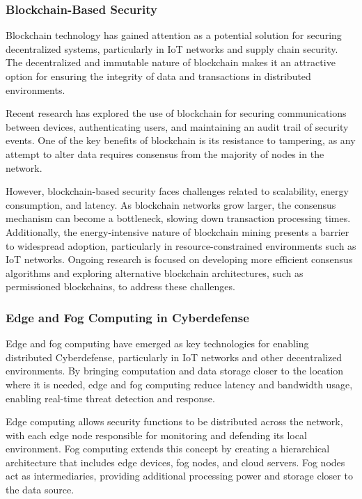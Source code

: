 \subsubsection{Blockchain-Based Security}

Blockchain technology has gained attention as a potential solution for securing decentralized systems, particularly in IoT networks and supply chain security. The decentralized and immutable nature of blockchain makes it an attractive option for ensuring the integrity of data and transactions in distributed environments.

Recent research has explored the use of blockchain for securing communications between devices, authenticating users, and maintaining an audit trail of security events. One of the key benefits of blockchain is its resistance to tampering, as any attempt to alter data requires consensus from the majority of nodes in the network.

However, blockchain-based security faces challenges related to scalability, energy consumption, and latency. As blockchain networks grow larger, the consensus mechanism can become a bottleneck, slowing down transaction processing times. Additionally, the energy-intensive nature of blockchain mining presents a barrier to widespread adoption, particularly in resource-constrained environments such as IoT networks. Ongoing research is focused on developing more efficient consensus algorithms and exploring alternative blockchain architectures, such as permissioned blockchains, to address these challenges.

\subsubsection{Edge and Fog Computing in Cyberdefense}

Edge and fog computing have emerged as key technologies for enabling distributed Cyberdefense, particularly in IoT networks and other decentralized environments. By bringing computation and data storage closer to the location where it is needed, edge and fog computing reduce latency and bandwidth usage, enabling real-time threat detection and response.

Edge computing allows security functions to be distributed across the network, with each edge node responsible for monitoring and defending its local environment. Fog computing extends this concept by creating a hierarchical architecture that includes edge devices, fog nodes, and cloud servers. Fog nodes act as intermediaries, providing additional processing power and storage closer to the data source.

